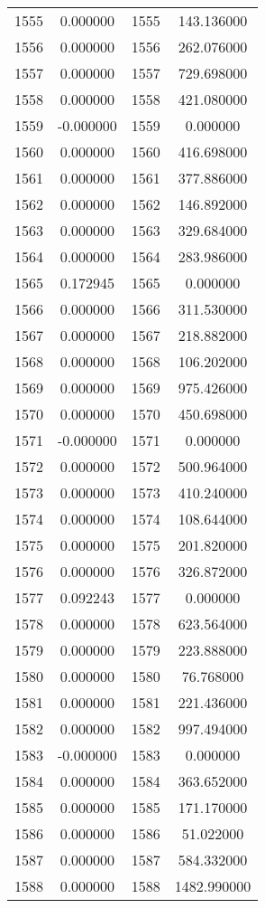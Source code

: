 \documentclass[12pt]{article}
\begin{document}
\begin{longtable}{@{}cccc@{}}
1555 & 0.000000 & 1555 & 143.136000 \\
1556 & 0.000000 & 1556 & 262.076000 \\
1557 & 0.000000 & 1557 & 729.698000 \\
1558 & 0.000000 & 1558 & 421.080000 \\
1559 & -0.000000 & 1559 & 0.000000 \\
1560 & 0.000000 & 1560 & 416.698000 \\
1561 & 0.000000 & 1561 & 377.886000 \\
1562 & 0.000000 & 1562 & 146.892000 \\
1563 & 0.000000 & 1563 & 329.684000 \\
1564 & 0.000000 & 1564 & 283.986000 \\
1565 & 0.172945 & 1565 & 0.000000 \\
1566 & 0.000000 & 1566 & 311.530000 \\
1567 & 0.000000 & 1567 & 218.882000 \\
1568 & 0.000000 & 1568 & 106.202000 \\
1569 & 0.000000 & 1569 & 975.426000 \\
1570 & 0.000000 & 1570 & 450.698000 \\
1571 & -0.000000 & 1571 & 0.000000 \\
1572 & 0.000000 & 1572 & 500.964000 \\
1573 & 0.000000 & 1573 & 410.240000 \\
1574 & 0.000000 & 1574 & 108.644000 \\
1575 & 0.000000 & 1575 & 201.820000 \\
1576 & 0.000000 & 1576 & 326.872000 \\
1577 & 0.092243 & 1577 & 0.000000 \\
1578 & 0.000000 & 1578 & 623.564000 \\
1579 & 0.000000 & 1579 & 223.888000 \\
1580 & 0.000000 & 1580 & 76.768000 \\
1581 & 0.000000 & 1581 & 221.436000 \\
1582 & 0.000000 & 1582 & 997.494000 \\
1583 & -0.000000 & 1583 & 0.000000 \\
1584 & 0.000000 & 1584 & 363.652000 \\
1585 & 0.000000 & 1585 & 171.170000 \\
1586 & 0.000000 & 1586 & 51.022000 \\
1587 & 0.000000 & 1587 & 584.332000 \\
1588 & 0.000000 & 1588 & 1482.990000 \\

\end{longtable}
\end{document}
